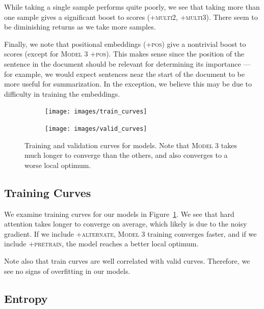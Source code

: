 \documentclass[12pt]{report}
\begin{document}
While taking a single sample performs quite poorly, we see that taking more than one sample gives a significant boost to scores (\textsc{+multi2}, \textsc{+multi3}). There seem to be diminishing returns as we take more samples.

Finally, we note that positional embeddings (\textsc{+pos}) give a nontrivial boost to scores (except for \textsc{Model 3 +pos}). This makes sense since the position of the sentence in the document should be relevant for determining its importance --- for example, we would expect sentences near the start of the document to be more useful for summarization. In the exception, we believe this may be due to difficulty in training the embeddings.



\begin{figure}[t]
\centering
\begin{subfigure}{0.45\textwidth}
\texttt{[image: images/train\_curves]}
\end{subfigure}
\begin{subfigure}{0.45\textwidth}
\texttt{[image: images/valid\_curves]}
\end{subfigure}

\caption[Training Curves]{Training and validation curves for models. Note that \textsc{Model 3} takes much longer to converge than the others, and also converges to a worse local optimum.} %
\label{fig:train_curves}
\end{figure}


\subsection{Training Curves} We examine training curves for our models in Figure~\ref{fig:train_curves}. We see that hard attention takes longer to converge on average, which likely is due to the noisy gradient.
If we include \textsc{+alternate}, \textsc{Model 3} training converges faster, and if we include \textsc{+pretrain}, the model reaches a better local optimum.

Note also that train curves are well correlated with valid curves. Therefore, we see no signs of overfitting in our models.


\subsection{Entropy}
\end{document}
